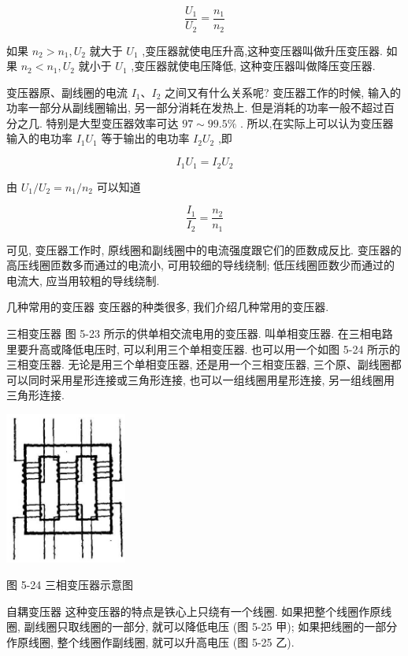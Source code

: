 \documentclass[10pt]{article}
\begin{document}
\[
\frac{{U}_{1}}{{U}_{2}} = \frac{{n}_{1}}{{n}_{2}}
\]

如果 \({n}_{2} > {n}_{1},{U}_{2}\) 就大于 \({U}_{1}\) ,变压器就使电压升高,这种变压器叫做升压变压器. 如果 \({n}_{2} < {n}_{1},{U}_{2}\) 就小于 \({U}_{1}\) ,变压器就使电压降低, 这种变压器叫做降压变压器.

变压器原、副线圈的电流 \({I}_{1}\text{、}{I}_{2}\) 之间又有什么关系呢? 变压器工作的时候, 输入的功率一部分从副线圈输出, 另一部分消耗在发热上. 但是消耗的功率一般不超过百分之几. 特别是大型变压器效率可达 \({97} \sim {99.5}\%\) . 所以,在实际上可以认为变压器输入的电功率 \({I}_{1}{U}_{1}\) 等于输出的电功率 \({I}_{2}{U}_{2}\) ,即

\[
{I}_{1}{U}_{1} = {I}_{2}{U}_{2}
\]

由 \({U}_{1}/{U}_{2} = {n}_{1}/{n}_{2}\) 可以知道

\[
\frac{{I}_{1}}{{I}_{2}} = \frac{{n}_{2}}{{n}_{1}}
\]

可见, 变压器工作时, 原线圈和副线圈中的电流强度跟它们的匝数成反比. 变压器的高压线圈匝数多而通过的电流小, 可用较细的导线绕制; 低压线圈匝数少而通过的电流大, 应当用较粗的导线绕制.

几种常用的变压器 变压器的种类很多, 我们介绍几种常用的变压器.

三相变压器 图 5-23 所示的供单相交流电用的变压器. 叫单相变压器. 在三相电路里要升高或降低电压时, 可以利用三个单相变压器. 也可以用一个如图 5-24 所示的三相变压器. 无论是用三个单相变压器, 还是用一个三相变压器, 三个原、副线圈都可以同时采用星形连接或三角形连接, 也可以一组线圈用星形连接, 另一组线圈用三角形连接.

\begin{center}
\includegraphics[max width=0.3\textwidth]{images/01913056-1f15-74d8-9184-9aab52c9d66b_182_602365.jpg}
\end{center}

图 5-24 三相变压器示意图

自耦变压器 这种变压器的特点是铁心上只绕有一个线圈. 如果把整个线圈作原线圈, 副线圈只取线圈的一部分, 就可以降低电压 (图 5-25 甲); 如果把线圈的一部分作原线圈, 整个线圈作副线圈, 就可以升高电压 (图 5-25 乙).
\end{document}
